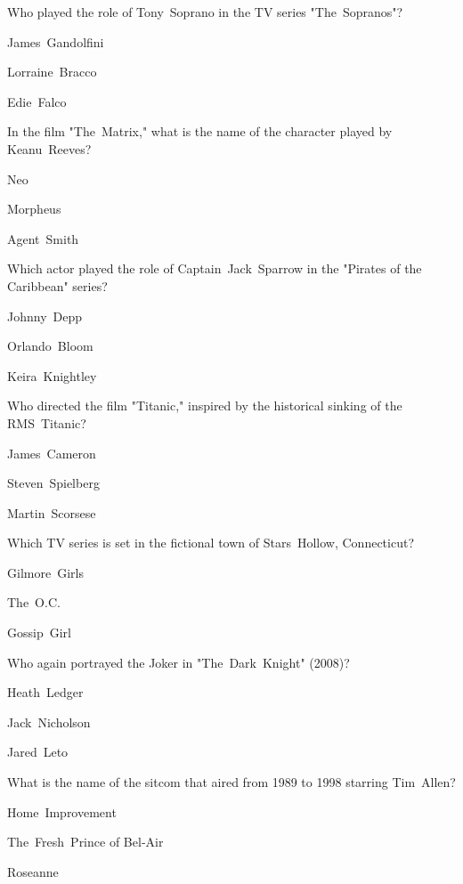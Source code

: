 \begin{enhancedmcq}{Who played the role of Tony Soprano in the TV series "The Sopranos"?}
\item James Gandolfini
\item Lorraine Bracco
\item Edie Falco

\end{enhancedmcq}
\begin{enhancedmcq}{In the film "The Matrix," what is the name of the character played by Keanu Reeves?}
\item Neo
\item Morpheus
\item Agent Smith

\end{enhancedmcq}
\begin{enhancedmcq}{Which actor played the role of Captain Jack Sparrow in the "Pirates of the Caribbean" series?}
\item Johnny Depp
\item Orlando Bloom
\item Keira Knightley

\end{enhancedmcq}
\begin{enhancedmcq}{Who directed the film "Titanic," inspired by the historical sinking of the RMS Titanic?}
\item James Cameron
\item Steven Spielberg
\item Martin Scorsese

\end{enhancedmcq}
\begin{enhancedmcq}{Which TV series is set in the fictional town of Stars Hollow, Connecticut?}
\item Gilmore Girls
\item The O.C.
\item Gossip Girl

\end{enhancedmcq}
\begin{enhancedmcq}{Who again portrayed the Joker in "The Dark Knight" (2008)?}
\item Heath Ledger
\item Jack Nicholson
\item Jared Leto

\end{enhancedmcq}
\begin{enhancedmcq}{What is the name of the sitcom that aired from 1989 to 1998 starring Tim Allen?}
\item Home Improvement
\item The Fresh Prince of Bel‑Air
\item Roseanne

\end{enhancedmcq}
